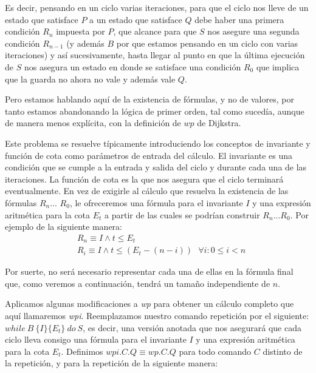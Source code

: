 \documentclass[12pt, a4paper, openany, fleqn]{book}
\begin{document}
    Es decir, pensando en un ciclo varias iteraciones, para que el ciclo nos lleve de un estado que satisface $P$ a un estado que satisface $Q$ debe haber una primera condición $R_n$ impuesta por $P$, que alcance para que $S$ nos asegure una segunda condición $R_{n-1}$ (y además $B$ por que estamos pensando en un ciclo con varias iteraciones) y así sucesivamente, hasta llegar al punto en que la última ejecución de $S$ nos asegura un estado en donde se satisface una condición $R_0$ que implica que la guarda no ahora no vale y además vale $Q$.

    Pero estamos hablando aquí de la existencia de fórmulas, y no de valores, por tanto estamos abandonando la lógica de primer orden, tal como sucedía, aunque de manera menos explícita, con la definición de $wp$ de Dijkstra.

    Este problema se resuelve típicamente introduciendo los conceptos de invariante y función de cota como parámetros de entrada del cálculo. El invariante es una condición que se cumple a la entrada y salida del ciclo y durante cada una de las iteraciones. La función de cota es la que nos asegura que el ciclo terminará eventualmente. En vez de exigirle al cálculo que resuelva la existencia de las fórmulas $R_n$... $R_0$, le ofreceremos una fórmula para el invariante $I$ y una expresión aritmética para la cota $E_t$ a partir de las cuales se podrían construir $R_n$...$R_0$. Por ejemplo de la siguiente manera:
    \begin{align*}
        & R_n \equiv I \land t \leqslant E_t \\ 
        & R_i \equiv  I \land t \leqslant (E_t - (n - i)) \ \ \ \forall i : 0 \leqslant i < n
    \end{align*}

    Por suerte, no será necesario representar cada una de ellas en la fórmula final que, como veremos a continuación, tendrá un tamaño independiente de $n$.

    Aplicamos algunas modificaciones a \textit{wp} para obtener un cálculo completo que aquí llamaremos \textit{wpi}.
    Reemplazamos nuestro comando repetición por el siguiente: $while\ B\ \{I\}\{E_t\}\ do\ S$, es decir, una versión anotada que nos asegurará que cada ciclo lleva consigo una fórmula para el invariante $I$ y una expresión aritmética para la cota $E_t$. Definimos $wpi.C.Q \equiv wp.C.Q$ para todo comando $C$ distinto de la repetición, y para la repetición de la siguiente manera:
\end{document}
